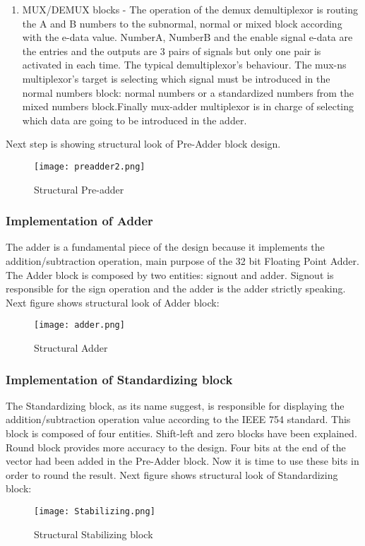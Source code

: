 \documentclass{scrreprt}
\begin{document}
\begin{enumerate}
    \item MUX/DEMUX blocks - The operation of the demux demultiplexor is routing the A and B numbers to the subnormal, normal or mixed block according with the e-data value. NumberA, NumberB and the enable signal e-data are the entries and the outputs are 3 pairs of signals but only one pair is activated in each time. The typical demultiplexor’s behaviour. The mux-ns multiplexor’s target is selecting which signal must be introduced in the normal numbers block: normal numbers or a standardized numbers from the mixed numbers block.Finally mux-adder multiplexor is in charge of selecting which data are going to be introduced in the adder.  
\end{enumerate}
Next step is showing structural look of Pre-Adder block design. 
\begin{figure}[htb!]
    \centering
    \texttt{[image: preadder2.png]}
    \caption{Structural Pre-adder}
    \label{fig:preadder}
\end{figure}
\subsubsection*{Implementation of Adder}
The adder is a fundamental piece of the design because it implements the addition/subtraction operation, main purpose of the 32 bit Floating Point Adder. 
The Adder block is composed by two entities: signout and adder. Signout is responsible for the sign operation and the adder is the adder strictly speaking. 
Next figure shows structural look of Adder block:
\begin{figure}[htb!]
    \centering
    \texttt{[image: adder.png]}
    \caption{Structural Adder}
    \label{fig:adder}
\end{figure}
\subsubsection*{Implementation of Standardizing block}
The Standardizing block, as its name suggest, is responsible for displaying the addition/subtraction operation value according to the IEEE 754 standard. 
This block is composed of four entities. Shift-left and zero blocks have been explained. Round block provides more accuracy to the design. Four bits at the end of the vector had been added in the Pre-Adder block. Now it is time to use these bits in order to round the result.
Next figure shows structural look of Standardizing block:
\begin{figure}[htb!]
    \centering
    \texttt{[image: Stabilizing.png]}
    \caption{Structural Stabilizing block}
    \label{fig:Stabilizing}
\end{figure}
\end{document}
